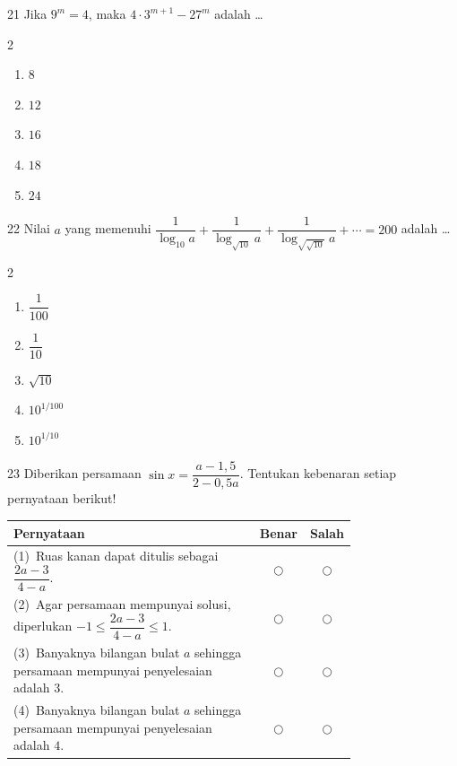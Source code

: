 \documentclass[11pt]{article}
\newenvironment{pilB}{%
  \par\smallskip\begin{multicols}{2}
  \begin{enumerate}[label=(\Alph*),leftmargin=*,itemsep=1pt,topsep=3pt]}%
  {\end{enumerate}\end{multicols}}
\begin{document}
\begin{soal}{21}
Jika $9^m=4$, maka $4\cdot3^{m+1}-27^m$ adalah \ldots
\begin{pilB}
  \item $8$ \item $12$ \item $16$ \item $18$ \item $24$
\end{pilB}
\end{soal}

\begin{soal}{22}
Nilai $a$ yang memenuhi
$\dfrac{1}{\log_{10}a}+\dfrac{1}{\log_{\sqrt{10}}a}+\dfrac{1}{\log_{\sqrt{\sqrt{10}}}a}+\cdots=200$
adalah \ldots
\begin{pilB}
  \item $\dfrac{1}{100}$ \item $\dfrac{1}{10}$ \item $\sqrt{10}$
  \item $10^{1/100}$ \item $10^{1/10}$
\end{pilB}
\end{soal}

\begin{soal}{23}
Diberikan persamaan $\sin x=\dfrac{a-1{,}5}{2-0{,}5a}$.
Tentukan kebenaran setiap pernyataan berikut!

\par\smallskip
{\renewcommand{\arraystretch}{1.4}%
\begin{tabular}{@{}p{0.76\linewidth}cc@{}}
\hline
\textbf{Pernyataan} & \textbf{Benar} & \textbf{Salah}\\
\hline
(1)~Ruas kanan dapat ditulis sebagai $\dfrac{2a-3}{4-a}$.
  & $\bigcirc$ & $\bigcirc$\\
(2)~Agar persamaan mempunyai solusi, diperlukan
    $-1\leq\dfrac{2a-3}{4-a}\leq1$.
  & $\bigcirc$ & $\bigcirc$\\
(3)~Banyaknya bilangan bulat $a$ sehingga persamaan mempunyai
    penyelesaian adalah $3$.
  & $\bigcirc$ & $\bigcirc$\\
(4)~Banyaknya bilangan bulat $a$ sehingga persamaan mempunyai
    penyelesaian adalah $4$.
  & $\bigcirc$ & $\bigcirc$\\
\hline
\end{tabular}}
\end{soal}
\end{document}

